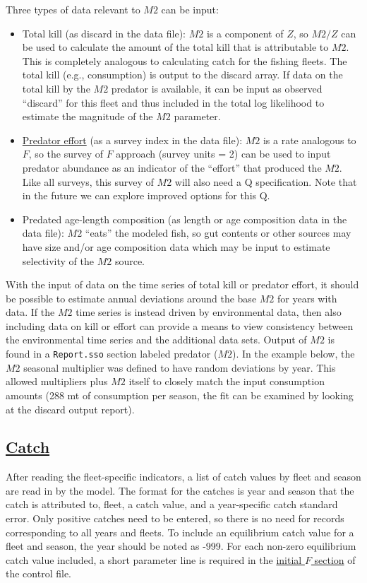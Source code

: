 Three types of data relevant to $M2$ can be input:

\begin{itemize}
	\item Total kill (as discard in the data file): $M2$ is a component of $Z$, so $M2/Z$ can be used to calculate the amount of the total kill that is attributable to $M2$. This is completely analogous to calculating catch for the fishing fleets. The total kill (e.g., consumption) is output to the discard array. If data on the total kill by the $M2$ predator is available, it can be input as observed ``discard'' for this fleet and thus included in the total log likelihood to estimate the magnitude of the $M2$ parameter.
	
	\item \hyperlink{PredEffort}{Predator effort} (as a survey index in the data file): $M2$ is a rate analogous to $F$, so the survey of $F$ approach (survey units = 2) can be used to input predator abundance as an indicator of the ``effort'' that produced the $M2$. Like all surveys, this survey of $M2$ will also need a Q specification. Note that in the future we can explore improved options for this Q.
	
	\item Predated age-length composition (as length or age composition data in the data file): $M2$ ``eats'' the modeled fish, so gut contents or other sources may have size and/or age composition data which may be input to estimate selectivity of the $M2$ source. 
\end{itemize}

With the input of data on the time series of total kill or predator effort, it should be possible to estimate annual deviations around the base $M2$ for years with data. If the $M2$ time series is instead driven by environmental data, then also including data on kill or effort can provide a means to view consistency between the environmental time series and the additional data sets. Output of $M2$ is found in a \texttt{Report.sso} section labeled predator ($M2$). In the example below, the $M2$ seasonal multiplier was defined to have random deviations by year. This allowed multipliers plus $M2$ itself to closely match the input consumption amounts (288 mt of consumption per season, the fit can be examined by looking at the discard output report).

\hyperlink{Catch}{}
\subsection[Catch]{\protect\hyperlink{Catch}{Catch}}
\hypertarget{CatchFormat}{}
After reading the fleet-specific indicators, a list of catch values by fleet and season are read in by the model. The format for the catches is year and season that the catch is attributed to, fleet, a catch value, and a year-specific catch standard error. Only positive catches need to be entered, so there is no need for records corresponding to all years and fleets. To include an equilibrium catch value for a fleet and season, the year should be noted as -999. For each non-zero equilibrium catch value included, a short parameter line is required in the \hyperlink{InitF}{initial $F$ section} of the control file.

